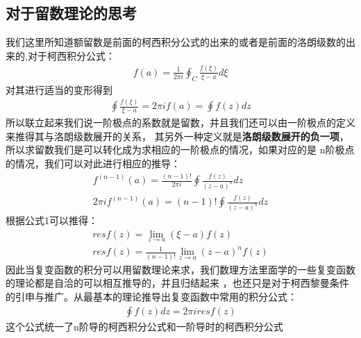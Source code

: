 \documentclass[UTF8]{article}
\begin{document}
\subsection{对于留数理论的思考}
我们这里所知道额留数是前面的柯西积分公式的出来的或者是前面的洛朗级数的出来的,对于柯西积分公式：
\begin{align*}
	f(a)=\frac{1}{2\pi i}\oint_{C}\frac{f(\xi)}{\xi-a}d\xi
\end{align*}
对其进行适当的变形得到
\begin{align*}
	\oint\frac{f(\xi)}{\xi-a}=2\pi i f(a)=\oint f(z)dz
\end{align*}
所以联立起来我们说一阶极点的系数就是留数，并且我们还可以由一阶极点的定义来推得其与洛朗级数展开的关系，
其另外一种定义就是\textbf{洛朗级数展开的负一项}，所以求留数我们是可以转化成为求相应的一阶极点的情况，如果对应的是
n阶极点的情况，我们可以对此进行相应的推导：
\begin{gather}
	f^{(n-1)}(a)=\frac{(n-1)!}{2\pi i}\oint \frac{f(z)}{(z-a)^n}dz\\
	2\pi i f^{(n-1)}(a)=(n-1)!\oint \frac{f(z)}{(z-a)^n}dz
\end{gather}
根据公式1可以推得：
\begin{align*}
	resf(z)=\lim_{z\rightarrow a}(\xi-a)f(z) \\
	resf(z)=\frac{1}{(n-1)!}\lim_{z\rightarrow a}(z-a)^n f(z)
\end{align*}
因此当复变函数的积分可以用留数理论来求，我们数理方法里面学的一些复变函数的理论都是自洽的可以相互推导的，并且归结起来
，也还只是对于柯西黎曼条件的引申与推广。从最基本的理论推导出复变函数中常用的积分公式：
\begin{align*}
	\oint f(z)dz=2\pi i res f(z)
\end{align*}
这个公式统一了n阶导的柯西积分公式和一阶导时的柯西积分公式
\end{document}
